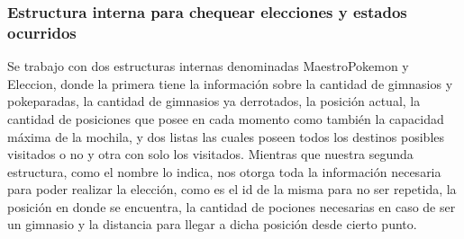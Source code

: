 \subsubsection{Estructura interna para chequear elecciones y estados ocurridos}

Se trabajo con dos estructuras internas denominadas MaestroPokemon y Eleccion, donde la primera tiene la informaci\'on sobre la cantidad de gimnasios y pokeparadas, la cantidad de gimnasios ya derrotados, la posici\'on actual, la cantidad de posiciones que posee en cada momento como tambi\'en la capacidad m\'axima de la mochila, y dos listas las cuales poseen todos los destinos posibles visitados o no y otra con solo los visitados.
Mientras que nuestra segunda estructura, como el nombre lo indica, nos otorga toda la informaci\'on necesaria para poder realizar la elecci\'on, como es el id de la misma para no ser repetida, la posici\'on en donde se encuentra, la cantidad de pociones necesarias en caso de ser un gimnasio y la distancia para llegar a dicha posici\'on desde cierto punto.

